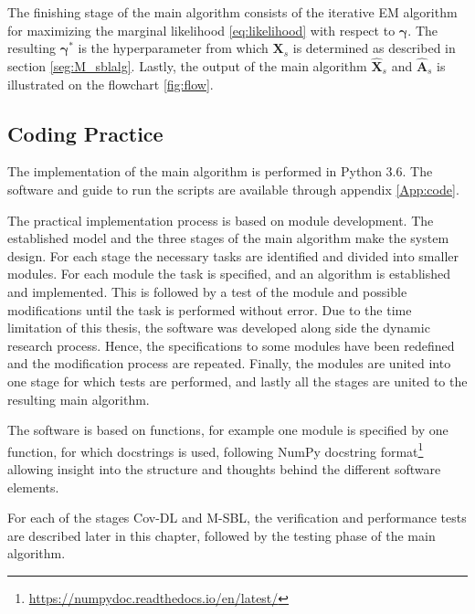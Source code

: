 The finishing stage of the main algorithm consists of the iterative EM algorithm for maximizing the marginal likelihood \eqref{eq:likelihood} with respect to $\boldsymbol{\gamma}$. The resulting $\boldsymbol{\gamma}^{\ast}$ is the hyperparameter from which $\mathbf{X}_s$ is determined as described in section \ref{seg:M_sblalg}. 
Lastly, the output of the main algorithm $\hat{\mathbf{X}}_s$ and $\hat{\mathbf{A}}_s$ is illustrated on the flowchart \ref{fig:flow}.

\subsection{Coding Practice}
The implementation of the main algorithm is performed in Python 3.6. The software and guide to run the scripts are available through appendix \ref{App:code}.

The practical implementation process is based on module development. 
The established model and the three stages of the main algorithm make the system design. 
For each stage the necessary tasks are identified and divided into smaller modules. 
For each module the task is specified, and an algorithm is established and implemented. 
This is followed by a test of the module and possible modifications until the task is performed without error. 
Due to the time limitation of this thesis, the software was developed along side the dynamic research process. 
Hence, the specifications to some modules have been redefined and the modification process are repeated. 
Finally, the modules are united into one stage for which tests are performed, and lastly all the stages are united to the resulting main algorithm.

The software is based on functions, for example one module is specified by one function, for which docstrings is used, following NumPy docstring format\footnote{\url{https://numpydoc.readthedocs.io/en/latest/}} allowing insight into the structure and thoughts behind the different software elements.

For each of the stages Cov-DL and M-SBL,  the verification and performance tests are described later in this chapter, followed by the testing phase of the main algorithm. 
